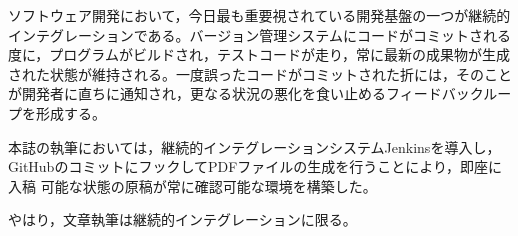 ソフトウェア開発において，今日最も重要視されている開発基盤の一つが継続的
インテグレーションである。バージョン管理システムにコードがコミットされる
度に，プログラムがビルドされ，テストコードが走り，常に最新の成果物が生成
された状態が維持される。一度誤ったコードがコミットされた折には，そのこと
が開発者に直ちに通知され，更なる状況の悪化を食い止めるフィードバックルー
プを形成する。


本誌の執筆においては，継続的インテグレーションシステムJenkinsを導入し，
GitHubのコミットにフックしてPDFファイルの生成を行うことにより，即座に入稿
可能な状態の原稿が常に確認可能な環境を構築した。

やはり，文章執筆は継続的インテグレーションに限る。
